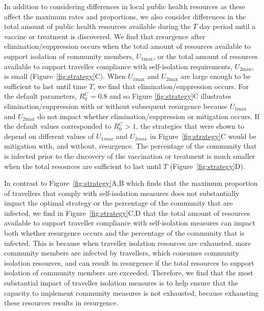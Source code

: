 \documentclass[pdflatex]{sn-jnl}
\theoremstyle{thmstyleone}%
\theoremstyle{thmstyletwo}%
\theoremstyle{thmstylethree}%
\begin{document}
In addition to considering differences in local public health resources as these affect the maximum rates and proportions, we also consider differences in the total amount of public health resources available during the $T$ day period until a vaccine or treatment is discovered. We find that resurgence after elimination/suppression occurs when the total amount of resources available to support isolation of community members, $U_{1\text{max}}$, or the total amount of resources available to support traveller compliance with self-isolation requirements, $U_{2\text{max}}$, is small (Figure~\ref{fig:strategy}C). When $U_{1\text{max}}$ and $U_{2\text{max}}$ are large enough to be sufficient to last until time $T$, we find that elimination/suppression occurs. For the default parameters, $R_0^C = 0.8$ and so Figure \ref{fig:strategy}C illustrates elimination/suppression with or without subsequent resurgence because $U_{1\text{max}}$ and $U_{2\text{max}}$ do not impact whether elimination/suppression or mitigation occurs. If the default values corresponded to $R_0^C > 1$, the strategies that were shown to depend on different values of $U_{1max}$ and $U_{2max}$ in Figure~\ref{fig:strategy}C would be mitigation with, and without, resurgence. The percentage of the community that is infected prior to the discovery of the vaccination or treatment is much smaller when the total resources are sufficient to last until $T$ (Figure~\ref{fig:strategy}D).

In contrast to Figure~\ref{fig:strategy}A,B which finds that the maximum proportion of travellers that comply with self-isolation measures does not substantially impact the optimal strategy or the percentage of the community that are infected, we find in Figure~\ref{fig:strategy}C,D that the total amount of resources available to support traveller compliance with self-isolation measures can impact both whether resurgence occurs and the percentage of the community that is infected. This is because when traveller isolation resources are exhausted, more community members are infected by travellers, which consumes community isolation resources, and can result in resurgence if the total resources to support isolation of community members are exceeded. Therefore, we find that the most substantial impact of traveller isolation measures is to help ensure that the capacity to implement community measures is not exhausted, because exhausting these resources results in resurgence.
\end{document}

